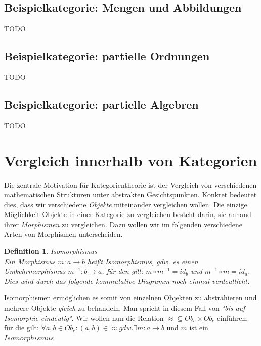 \documentclass[a4paper]{scrartcl}
\newtheorem{definition}{Definition}
\begin{document}
\begin{center}
\end{center}




  
\subsection{Beispielkategorie: Mengen und Abbildungen}
TODO
\subsection{Beispielkategorie: partielle Ordnungen}
TODO
\subsection{Beispielkategorie: partielle Algebren}
TODO

\section{Vergleich innerhalb von Kategorien}
Die zentrale Motivation für Kategorientheorie ist der Vergleich von verschiedenen mathematischen Strukturen unter abstrakten Gesichtspunkten. Konkret bedeutet dies, dass wir verschiedene \emph{Objekte} miteinander vergleichen wollen. Die einzige Möglichkeit Objekte in einer Kategorie zu vergleichen besteht darin, sie anhand ihrer \emph{Morphismen} zu vergleichen. Dazu wollen wir im folgenden verschiedene Arten von Morphismen unterscheiden. 
\begin{definition}{Isomorphismus}\\
Ein Morphismus $m: a \rightarrow b$ heißt Isomorphismus, gdw. es einen Umkehrmorphismus $m^{-1}: b \rightarrow a$, für den gilt: $m \circ m^{-1} = id_b$ und $m^{-1} \circ m = id_a$. Dies wird durch das folgende kommutative Diagramm noch einmal verdeutlicht. 
\begin{center}
\end{center}
\end{definition}
Isomorphismen ermöglichen es somit von einzelnen Objekten zu abstrahieren und mehrere Objekte \emph{gleich} zu behandeln. Man spricht in diesem Fall von \emph{"bis auf Isomorphie eindeutig"}. Wir wollen nun die Relation $\approx \subseteq Ob_c \times Ob_c$ einführen, für die gilt: $ \forall a,b \in Ob_c: (a,b) \in \approx gdw. \exists m: a \rightarrow b$ und $m$ ist ein $Isomorphismus$. 
\end{document}
